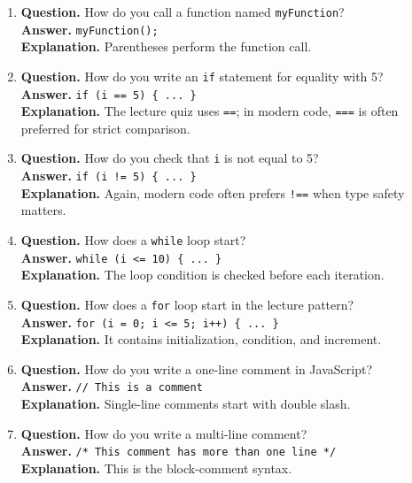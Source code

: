 \documentclass[11pt,a4paper]{article}
\begin{document}
\begin{enumerate}
  \item \textbf{Question.} How do you call a function named \texttt{myFunction}?\\
  \textbf{Answer.} \texttt{myFunction();}\\
  \textbf{Explanation.} Parentheses perform the function call.

  \item \textbf{Question.} How do you write an \texttt{if} statement for equality with 5?\\
  \textbf{Answer.} \texttt{if (i == 5) \{ ... \}}\\
  \textbf{Explanation.} The lecture quiz uses \texttt{==}; in modern code, \texttt{===} is often preferred for strict comparison.

  \item \textbf{Question.} How do you check that \texttt{i} is not equal to 5?\\
  \textbf{Answer.} \texttt{if (i != 5) \{ ... \}}\\
  \textbf{Explanation.} Again, modern code often prefers \texttt{!==} when type safety matters.

  \item \textbf{Question.} How does a \texttt{while} loop start?\\
  \textbf{Answer.} \texttt{while (i <= 10) \{ ... \}}\\
  \textbf{Explanation.} The loop condition is checked before each iteration.

  \item \textbf{Question.} How does a \texttt{for} loop start in the lecture pattern?\\
  \textbf{Answer.} \texttt{for (i = 0; i <= 5; i++) \{ ... \}}\\
  \textbf{Explanation.} It contains initialization, condition, and increment.

  \item \textbf{Question.} How do you write a one-line comment in JavaScript?\\
  \textbf{Answer.} \texttt{// This is a comment}\\
  \textbf{Explanation.} Single-line comments start with double slash.

  \item \textbf{Question.} How do you write a multi-line comment?\\
  \textbf{Answer.} \texttt{/* This comment has more than one line */}\\
  \textbf{Explanation.} This is the block-comment syntax.


\end{enumerate}
\end{document}
